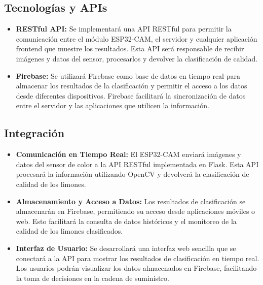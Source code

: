\subsection{Tecnologías y APIs}
\begin{itemize}
    \item \textbf{RESTful API:} Se implementará una API RESTful para permitir la comunicación entre el módulo ESP32-CAM, el servidor y cualquier aplicación frontend que muestre los resultados. Esta API será responsable de recibir imágenes y datos del sensor, procesarlos y devolver la clasificación de calidad.
    
    \item \textbf{Firebase:} Se utilizará Firebase como base de datos en tiempo real para almacenar los resultados de la clasificación y permitir el acceso a los datos desde diferentes dispositivos. Firebase facilitará la sincronización de datos entre el servidor y las aplicaciones que utilicen la información.
\end{itemize}

\subsection{Integración}
\begin{itemize}
    \item \textbf{Comunicación en Tiempo Real:} El ESP32-CAM enviará imágenes y datos del sensor de color a la API RESTful implementada en Flask. Esta API procesará la información utilizando OpenCV y devolverá la clasificación de calidad de los limones.
    
    \item \textbf{Almacenamiento y Acceso a Datos:} Los resultados de clasificación se almacenarán en Firebase, permitiendo su acceso desde aplicaciones móviles o web. Esto facilitará la consulta de datos históricos y el monitoreo de la calidad de los limones clasificados.
    
    \item \textbf{Interfaz de Usuario:} Se desarrollará una interfaz web sencilla que se conectará a la API para mostrar los resultados de clasificación en tiempo real. Los usuarios podrán visualizar los datos almacenados en Firebase, facilitando la toma de decisiones en la cadena de suministro.
\end{itemize}
